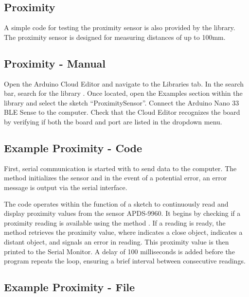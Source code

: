 \subsection{Proximity}

A simple code for testing the proximity sensor is also provided by the library. The proximity sensor is designed for measuring distances of up to 100mm.

\subsection{Proximity - Manual}

Open the Arduino Cloud Editor and navigate to the Libraries tab. In the search bar, search for the library . Once located, open the Examples section within the library and select the sketch ``ProximitySensor''.
\smallskip
Connect the Arduino Nano 33 BLE Sense to the computer. Check that the Cloud Editor recognizes the board by verifying if both the board and port are listed in the dropdown menu.

\subsection{Example Proximity - Code}

First, serial communication is started with  to send data to the computer. The method   initializes the sensor and in the event of a potential error, an error message is output via the serial interface.


\bigskip


The code operates within the function   of a sketch to continuously read and display proximity values from the sensor APDS-9960. It begins by checking if a proximity reading is available using the method . If a reading is ready, the method  retrieves the proximity value, where  indicates a close object,  indicates a distant object, and  signals an error in reading. This proximity value is then printed to the Serial Monitor. A delay of 100 milliseconds is added before the program repeats the loop, ensuring a brief interval between consecutive readings.


\subsection{Example Proximity - File}

